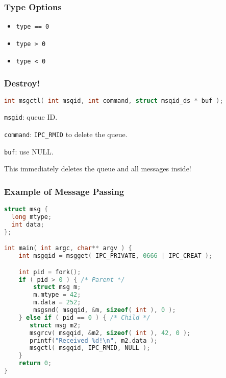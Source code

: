 \begin{frame}[fragile]
\frametitle{Type Options}
\begin{itemize}
	\item \texttt{type == 0}
	\item \texttt{type > 0}
	\item \texttt{type < 0}
\end{itemize}
\end{frame}

\begin{frame}[fragile]
\frametitle{Destroy!}
\begin{lstlisting}[language=C]
int msgctl( int msqid, int command, struct msqid_ds * buf );
\end{lstlisting}

\texttt{msgid}: queue ID.

\texttt{command}:  \texttt{IPC\_RMID} to delete the queue.

\texttt{buf}: use NULL.

This immediately deletes the queue and all messages inside!

\end{frame}


\begin{frame}[fragile]
\frametitle{Example of Message Passing}

\begin{lstlisting}[language=C]
struct msg {
  long mtype;
  int data;
};

int main( int argc, char** argv ) { 
    int msgqid = msgget( IPC_PRIVATE, 0666 | IPC_CREAT );

    int pid = fork();
    if ( pid > 0 ) { /* Parent */
        struct msg m;
        m.mtype = 42; 
        m.data = 252;
        msgsnd( msgqid, &m, sizeof( int ), 0 );
    } else if ( pid == 0 ) { /* Child */
       struct msg m2; 
       msgrcv( msgqid, &m2, sizeof( int ), 42, 0 );
       printf("Received %d!\n", m2.data );
       msgctl( msgqid, IPC_RMID, NULL );
    }   
    return 0;
}
\end{lstlisting}


\end{frame}








